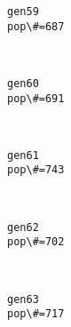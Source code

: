 \documentclass[11pt]{article}
\begin{document}
    \begin{Verbatim}[commandchars=\\\{\}]
gen59
pop\#=687

    \end{Verbatim}

    \begin{center}
    \end{center}
    { \hspace*{\fill} \\}
    
    \begin{Verbatim}[commandchars=\\\{\}]
gen60
pop\#=691

    \end{Verbatim}

    \begin{center}
    \end{center}
    { \hspace*{\fill} \\}
    
    \begin{Verbatim}[commandchars=\\\{\}]
gen61
pop\#=743

    \end{Verbatim}

    \begin{center}
    \end{center}
    { \hspace*{\fill} \\}
    
    \begin{Verbatim}[commandchars=\\\{\}]
gen62
pop\#=702

    \end{Verbatim}

    \begin{center}
    \end{center}
    { \hspace*{\fill} \\}
    
    \begin{Verbatim}[commandchars=\\\{\}]
gen63
pop\#=717

    \end{Verbatim}
\end{document}

